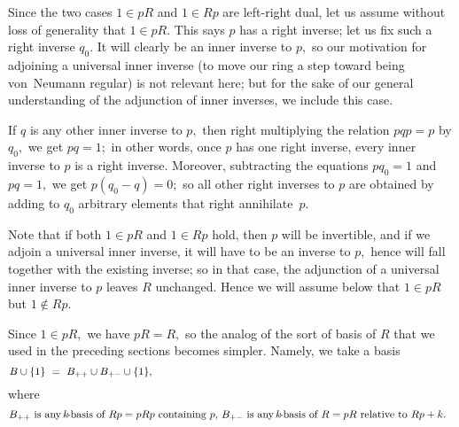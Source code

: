 \documentclass{amsart}
\begin{document}
Since the two cases $1\in pR$ and $1\in Rp$ are left-right dual,
let us assume without loss of generality that $1\in pR.$
This says $p$ has a right inverse; let us
fix such a right inverse $q_0.$
It will clearly be an inner inverse to $p,$
so our motivation for adjoining
a universal inner inverse (to move our ring a step toward being
von~Neumann regular) is not relevant here; but for the sake of
our general understanding of the adjunction of inner inverses,
we include this case.

If $q$ is any other inner inverse to $p,$ then right
multiplying the relation $pqp=p$ by $q_0,$ we get $pq=1;$
in other words, once $p$ has one right inverse, every
inner inverse to $p$ is a right inverse.
Moreover, subtracting the equations $pq_0=1$ and $pq=1,$
we get $p(q_0-q)=0;$ so all other right inverses to $p$ are obtained
by adding to $q_0$ arbitrary elements that right annihilate~$p.$

Note that if both $1\in pR$ and $1\in Rp$ hold, then $p$
will be invertible, and if we adjoin a universal inner inverse,
it will have to be an inverse to $p,$ hence will fall together
with the existing inverse; so in that case, the adjunction
of a universal inner inverse to $p$ leaves $R$ unchanged.
Hence we will assume below that $1\in pR$ but $1\notin Rp.$

Since $1\in pR,$ we have $pR=R,$ so the analog of the sort of
basis of $R$ that we used in the preceding sections becomes simpler.
Namely, we take a basis
\begin{equation}\begin{minipage}[c]{35pc}\label{d.RI:B=}
$B\cup\{1\}\ =\ B_{++}\cup B_{+-}\cup \{1\},$
\end{minipage}\end{equation}
where
\begin{equation}\begin{minipage}[c]{35pc}\label{d.RI:B_}
$B_{++}$ is any $\!k\!$-basis of $Rp=pRp$ containing $p,$

$B_{+-}$ is any $\!k\!$-basis of $R=pR$ relative to $Rp+k.$
\end{minipage}\end{equation}
\end{document}
